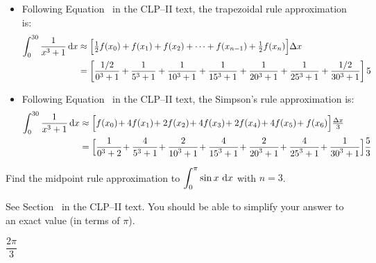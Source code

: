 \begin{solution}
\begin{itemize}
 \item
  Following Equation~ in the CLP--II text, the trapezoidal rule approximation is:
\begin{align*}
\int_0^{30} \frac{1}{x^3+1}\,\mathrm{d}x
&\approx\Big[\tfrac{1}{2} f(x_0)+f(x_1)+f(x_2)+\cdots+ f(x_{n-1})+\tfrac{1}{2} f(x_n)\Big]\Delta x\\
&=\left[
\frac{1/2}{0^3+1}+
\frac{1}{5^3+1}+
\frac{1}{10^3+1}+
\frac{1}{15^3+1}+
\frac{1}{20^3+1}+
\frac{1}{25^3+1}+
\frac{1/2}{30^3+1}
\right]5
\end{align*}

\item Following Equation~ in the CLP--II text, the Simpson's rule approximation is:
\begin{align*}
\int_0^{30} \frac{1}{x^3+1}\,\dee{x}
&\approx\Big[f(x_0)\!+4f(x_1)\!+2f(x_2)\!+4f(x_3)\!+2f(x_4)\!+4f(x_{5})\!+ f(x_6)\Big]\tfrac{\De x}{3}\\
&=\Big[\frac{1}{{0}^3+2}\!+\frac{4}{{5}^3+1}\!+\frac{2}{{10}^3+1}\!+\frac{4}{{15}^3+1}\!+\frac{2}{{20}^3+1}\!+\frac{4}{{25}^3+1}\!+ \frac{1}{{30}^3+1}\Big]\frac{5}{3}
\end{align*}

\end{itemize}
\end{solution}


\begin{question}[M121 2012A]\label{prob_s1.11_int2}
Find the midpoint rule approximation to $\displaystyle\int_0^\pi \sin x\ \mathrm{d}x$
with $n = 3$.
\end{question}

\begin{hint}
See Section~ in the
CLP--II text. You should be able to simplify your answer to an exact value (in terms of $\pi$).
\end{hint}

\begin{answer}
$\dfrac{2\pi}{3}$
\end{answer}

